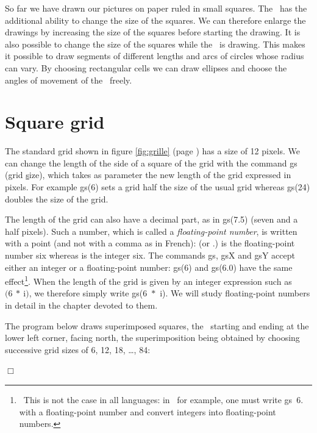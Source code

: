 So far we have drawn our pictures on paper ruled in small squares.
The \robot\ has the additional ability to change the size of the squares.
We can therefore enlarge the drawings by increasing the size of the squares before starting the drawing. It is also possible
to change the size of the squares while the \robot\ is drawing. This makes it possible to
draw segments of different lengths and arcs of circles whose radius can vary.
By choosing rectangular cells we can draw ellipses and choose
the angles of movement of the \robot\ freely.

\section{Square grid}
The standard grid shown in figure \ref{fig:grille} (page \pageref{fig:grille})
has a size of 12 pixels. We can change the
length of the side of a square of the grid with the command {\idt gs} (\underline{g}rid \underline{s}ize), which
takes as parameter the new length of the grid expressed in pixels. For example
{\idt gs(6)} sets a grid half the size of the usual grid whereas
{\idt gs(24)} doubles the size of the grid.

The length of the grid can also
have a decimal part, as in {\idt gs(7.5)} (seven and a half pixels). Such a
number, which is called a {\em floating-point number}, is written with a point
(and not with a comma as in French):
{} (or {.}) is the floating-point number six
whereas {} is the integer six. The commands {\idt gs}, {\idt gsX} and {\idt gsY}
accept either an integer or a floating-point number: {\idt gs(6)} and {\idt gs(6.0)}
have the same effect\footnote{\ This is not the case in all languages: in \ocaml\ for example,
one must write {\idt gs\ 6.} with a floating-point number and convert integers
into floating-point numbers.}.
When the length of the grid is given by an integer expression such as
$(6\ \ast\ ${\idt i}$)$, we therefore simply write {\idt gs(6\ $\ast$\ i)}. We will study
floating-point numbers in detail in the chapter devoted to them.

\begin{exemple}{\rm
 The program below draws superimposed squares, the \robot\ starting
 and ending at the lower left corner, facing north, the superimposition being
 obtained by choosing successive grid sizes of 6, 12, 18, \ldots, 84:

 
\noindent $\Box$ }\end{exemple}


